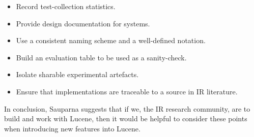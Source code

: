 \begin{itemize}
\item Record test-collection statistics.
\item Provide design documentation for systems.
\item Use a consistent naming scheme and a well-defined notation.
\item Build an evaluation table to be used as a sanity-check.
\item Isolate sharable experimental artefacts.
\item Ensure that implementations are traceable to a source in IR
  literature.
\end{itemize}

In conclusion, Sauparna suggests that if we, the IR research
community, are to build and work with Lucene, then it would be helpful
to consider these points when introducing new features into Lucene.


